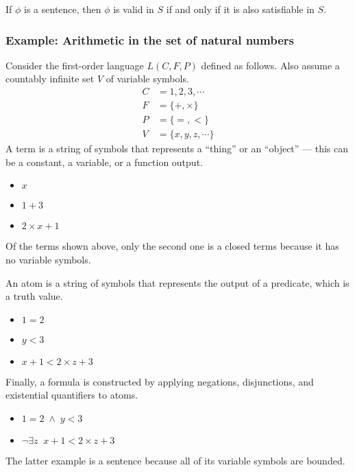 If \(\phi\) is a sentence, then \(\phi\) is valid in \(S\) if and only if it is also satisfiable in \(S\).



\subsubsection{Example: Arithmetic in the set of natural numbers}

Consider the first-order language \(L(C, F, P)\) defined as follows. Also assume a countably infinite set \(V\) of variable symbols.
%
\begin{align*}
    C &= 1, 2, 3, \cdots \tag{constant symbols}\\
    F &= \{+, \times\} \tag{function symbols, both binary}\\
    P &= \{=, <\} \tag{predicate symbols, both binary}\\
    V &= \{x, y, z, \cdots\} \tag{variable symbols}
\end{align*}
%
A term is a string of symbols that represents a ``thing'' or an ``object'' --- this can be a constant, a variable, or a function output.
%
\begin{itemize}
    \item \(x\)
    \item \(1 + 3\)
    \item \(2 \times x + 1\)
\end{itemize}
%
Of the terms shown above, only the second one is a closed terms because it has no variable symbols.

An atom is a string of symbols that represents the output of a predicate, which is a truth value.
%
\begin{itemize}
    \item \(1 = 2\)
    \item \(y < 3\)
    \item \(x + 1 < 2 \times z + 3\)
\end{itemize}
%
Finally, a formula is constructed by applying negations, disjunctions, and existential quantifiers to atoms.
%
\begin{itemize}
    \item \(1 = 2 \;\land\; y < 3\)
    \item \(\neg \exists z\;\; x + 1 < 2 \times z + 3\)
\end{itemize}
%
The latter example is a sentence because all of its variable symbols are bounded.

